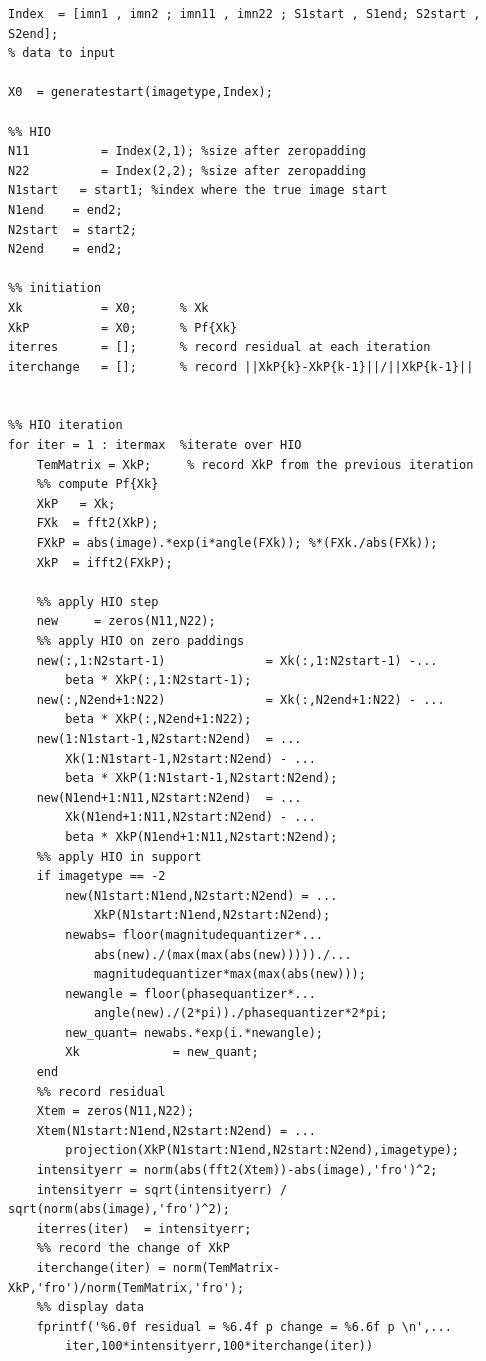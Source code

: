\documentclass[letter,14pt]{extreport}
\begin{document}
\begin{appendices}
\begin{lstlisting}
Index  = [imn1 , imn2 ; imn11 , imn22 ; S1start , S1end; S2start , S2end];
% data to input

X0  = generatestart(imagetype,Index);

%% HIO  
N11          = Index(2,1); %size after zeropadding
N22          = Index(2,2); %size after zeropadding
N1start   = start1; %index where the true image start
N1end    = end2;
N2start  = start2;
N2end    = end2;

%% initiation
Xk           = X0;      % Xk
XkP          = X0;      % Pf{Xk}
iterres      = [];      % record residual at each iteration
iterchange   = [];      % record ||XkP{k}-XkP{k-1}||/||XkP{k-1}||


%% HIO iteration
for iter = 1 : itermax  %iterate over HIO
    TemMatrix = XkP;     % record XkP from the previous iteration
    %% compute Pf{Xk}
    XkP   = Xk;
    FXk  = fft2(XkP);
    FXkP = abs(image).*exp(i*angle(FXk)); %*(FXk./abs(FXk));
    XkP  = ifft2(FXkP);
    
    %% apply HIO step
    new     = zeros(N11,N22);
    %% apply HIO on zero paddings
    new(:,1:N2start-1)              = Xk(:,1:N2start-1) -...
        beta * XkP(:,1:N2start-1);
    new(:,N2end+1:N22)              = Xk(:,N2end+1:N22) - ...
        beta * XkP(:,N2end+1:N22);
    new(1:N1start-1,N2start:N2end)  = ...
        Xk(1:N1start-1,N2start:N2end) - ...
        beta * XkP(1:N1start-1,N2start:N2end);
    new(N1end+1:N11,N2start:N2end)  = ...
        Xk(N1end+1:N11,N2start:N2end) - ...
        beta * XkP(N1end+1:N11,N2start:N2end);
    %% apply HIO in support
    if imagetype == -2
        new(N1start:N1end,N2start:N2end) = ...
            XkP(N1start:N1end,N2start:N2end);
        newabs= floor(magnitudequantizer*...
            abs(new)./(max(max(abs(new)))))./...
            magnitudequantizer*max(max(abs(new)));
        newangle = floor(phasequantizer*...
            angle(new)./(2*pi))./phasequantizer*2*pi;
        new_quant= newabs.*exp(i.*newangle);
        Xk             = new_quant;
    end
    %% record residual
    Xtem = zeros(N11,N22);
    Xtem(N1start:N1end,N2start:N2end) = ...
        projection(XkP(N1start:N1end,N2start:N2end),imagetype);
    intensityerr = norm(abs(fft2(Xtem))-abs(image),'fro')^2;
    intensityerr = sqrt(intensityerr) / sqrt(norm(abs(image),'fro')^2);
    iterres(iter)  = intensityerr;
    %% record the change of XkP
    iterchange(iter) = norm(TemMatrix-XkP,'fro')/norm(TemMatrix,'fro');
    %% display data
    fprintf('%6.0f residual = %6.4f p change = %6.6f p \n',...
        iter,100*intensityerr,100*iterchange(iter))
    

\end{lstlisting}
\end{appendices}
\end{document}
